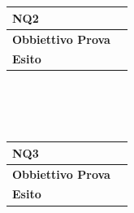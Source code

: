 \documentclass[11pt,titlepage,a4paper]{report}
\begin{document}
\\
\\
\begin{tabular}{||p{4.5cm}||p{7.5cm}||}
\hline
\textbf{\textsf{NQ2}}& \\
\hline
{\textbf {Obbiettivo Prova}}& \\ \hline
{\textbf{Esito}}&  \\ \hline
\end{tabular} \\
\\
\\
\begin{tabular}{||p{4.5cm}||p{7.5cm}||}
\hline
\textbf{\textsf{NQ3}}& \\
\hline
{\textbf {Obbiettivo Prova}}& \\ \hline
{\textbf{Esito}}&  \\ \hline
\end{tabular} \\
\end{document}
